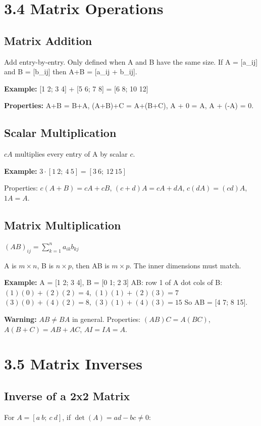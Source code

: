 \section{3.4 Matrix Operations}

\subsection{Matrix Addition}
Add entry-by-entry. Only defined when A and B have the same size.
If A = [a_{ij}] and B = [b_{ij}] then A+B = [a_{ij} + b_{ij}].

\textbf{Example:}
[1 2; 3 4] + [5 6; 7 8] = [6 8; 10 12]

\textbf{Properties:} A+B = B+A, (A+B)+C = A+(B+C),
A + 0 = A, A + (-A) = 0.

\subsection{Scalar Multiplication}
$cA$ multiplies every entry of A by scalar $c$.

\textbf{Example:} $3 \cdot [1\ 2;\ 4\ 5] = [3\ 6;\ 12\ 15]$

Properties: $c(A+B) = cA+cB$, $(c+d)A = cA+dA$,
$c(dA) = (cd)A$, $1A = A$.

\subsection{Matrix Multiplication}
$(AB)_{ij} = \sum_{k=1}^{n} a_{ik} b_{kj}$

A is $m \times n$, B is $n \times p$, then AB is $m \times p$.
The inner dimensions must match.

\textbf{Example:} A = [1 2; 3 4], B = [0 1; 2 3]
AB: row 1 of A dot cols of B:
$(1)(0)+(2)(2) = 4$, $(1)(1)+(2)(3) = 7$
$(3)(0)+(4)(2) = 8$, $(3)(1)+(4)(3) = 15$
So AB = [4 7; 8 15].

\textbf{Warning:} $AB \neq BA$ in general.
Properties: $(AB)C = A(BC)$, $A(B+C) = AB+AC$,
$AI = IA = A$.

\section{3.5 Matrix Inverses}

\subsection{Inverse of a 2x2 Matrix}
For $A = [a\ b;\ c\ d]$, if $\det(A) = ad - bc \neq 0$:

